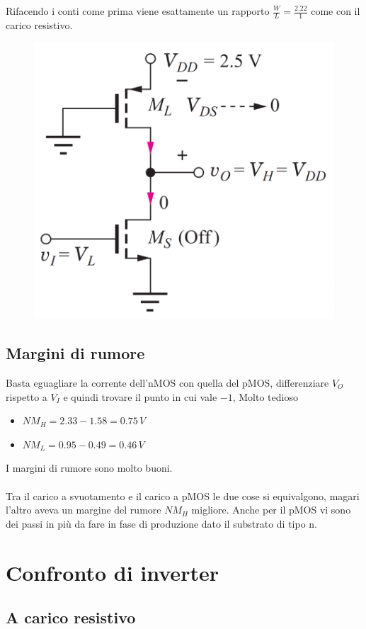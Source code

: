 Rifacendo i conti come prima viene esattamente un rapporto $\frac{W}{L} = \frac{2.22}{1}$ come con il carico resistivo.

\begin{figure}[htbp]
    \centering
    \includegraphics[width=0.37\linewidth]{img/OUTTTSS.png}    
    
\end{figure}

\subsection{Margini di rumore}
Basta	eguagliare	la	corrente	dell'nMOS con
quella	del	pMOS, differenziare $V_O$ rispetto a $V_I$ e	quindi	trovare	il	punto	in	cui	vale	$-1$, Molto	tedioso

\begin{itemize}
    \centering
    \item[] $NM_H = 2.33-1.58 = 0.75\, V$
    \item[] $NM_L = 0.95 - 0.49 = 0.46\, V$
\end{itemize}

I	margini	di	rumore	sono molto buoni. 

\paragraph{}

Tra il carico a svuotamento  e il carico a pMOS le due cose si equivalgono, magari l'altro aveva un margine del rumore $NM_H$ migliore. Anche per il pMOS vi sono dei passi in più da fare in fase di produzione dato il  substrato di tipo n.

\newpage
\section{Confronto di inverter}

\subsection{A carico resistivo}


